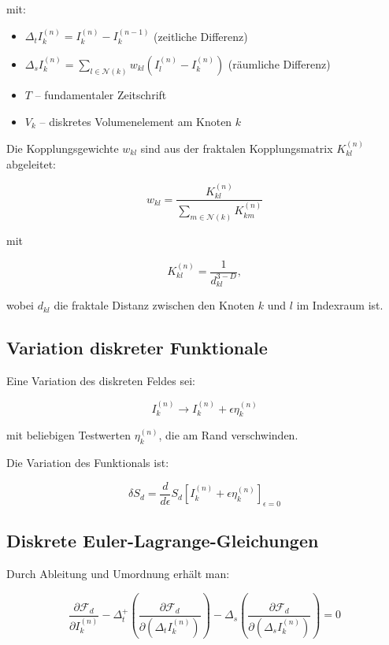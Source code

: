 mit:

\begin{itemize}
    \item \( \Delta_t I_k^{(n)} = I_k^{(n)} - I_k^{(n-1)} \) (zeitliche Differenz)
    \item \( \Delta_s I_k^{(n)} = \sum_{l \in \mathcal{N}(k)} w_{kl} (I_l^{(n)} - I_k^{(n)}) \) (räumliche Differenz)
    \item \( T \) – fundamentaler Zeitschrift
    \item \( V_k \) – diskretes Volumenelement am Knoten \( k \)
\end{itemize}

Die Kopplungsgewichte \( w_{kl} \) sind aus der fraktalen Kopplungsmatrix \( K_{kl}^{(n)} \) abgeleitet:

\[
w_{kl} = \frac{K_{kl}^{(n)}}{\sum_{m \in \mathcal{N}(k)} K_{km}^{(n)}}
\]

mit

\[
K_{kl}^{(n)} = \frac{1}{d_{kl}^{3-D}},
\]

wobei \( d_{kl} \) die fraktale Distanz zwischen den Knoten \( k \) und \( l \) im Indexraum ist.

\subsection{Variation diskreter Funktionale}
\label{sub:mathematik_variation}

Eine Variation des diskreten Feldes sei:

\[
I_k^{(n)} \to I_k^{(n)} + \epsilon \eta_k^{(n)}
\]

mit beliebigen Testwerten \( \eta_k^{(n)} \), die am Rand verschwinden.

Die Variation des Funktionals ist:

\[
\delta S_d = \frac{d}{d\epsilon} S_d \left[ I_k^{(n)} + \epsilon \eta_k^{(n)} \right]_{\epsilon=0}
\]

\subsection{Diskrete Euler-Lagrange-Gleichungen}
\label{sub:mathematik_euler_lagrange}

Durch Ableitung und Umordnung erhält man:

\[
\frac{\partial \mathcal{F}_d}{\partial I_k^{(n)}} - \Delta_t^+ \left( \frac{\partial \mathcal{F}_d}{\partial (\Delta_t I_k^{(n)})} \right) - \Delta_s \left( \frac{\partial \mathcal{F}_d}{\partial (\Delta_s I_k^{(n)})} \right) = 0
\]

